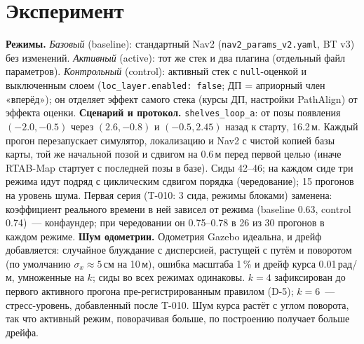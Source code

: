 \documentclass[10pt,twocolumn]{article}
\begin{document}
\section{Эксперимент}
\textbf{Режимы.} \emph{Базовый} (baseline): стандартный Nav2 (\texttt{nav2\_params\_v2.yaml}, BT v3) без изменений. \emph{Активный} (active): тот же стек и два плагина (отдельный файл параметров). \emph{Контрольный} (control): активный стек с \texttt{null}-оценкой и выключенным слоем (\texttt{loc\_layer.enabled: false}; ДП = априорный член «вперёд»); он отделяет эффект самого стека (курсы ДП, настройки PathAlign) от эффекта оценки.
\textbf{Сценарий и протокол.} \texttt{shelves\_loop\_a}: от позы появления $(-2.0,-0.5)$ через $(2.6,-0.8)$ и $(-0.5,2.45)$ назад к старту, 16.2\,м.
Каждый прогон перезапускает симулятор, локализацию и Nav2 с чистой копией базы карты, той же начальной позой и сдвигом на 0.6\,м перед первой целью (иначе RTAB-Map стартует с последней позы в базе). Сиды 42--46; на каждом сиде три режима идут подряд с циклическим сдвигом порядка (чередование); 15 прогонов на уровень шума.
Первая серия (T-010: 3 сида, режимы блоками) заменена: коэффициент реального времени в ней зависел от режима (baseline 0.63, control 0.74)~--- конфаундер; при чередовании он 0.75--0.78 в 26 из 30 прогонов в каждом режиме.
\textbf{Шум одометрии.} Одометрия Gazebo идеальна, и дрейф добавляется: случайное блуждание с дисперсией, растущей с путём и поворотом (по умолчанию $\sigma_x\approx5$\,см на 10\,м), ошибка масштаба 1\,\% и дрейф курса 0.01\,рад/м, умноженные на $k$; сиды во всех режимах одинаковы. $k=4$ зафиксирован до первого активного прогона пре-регистрированным правилом (D-5); $k=6$~--- стресс-уровень, добавленный после T-010. Шум курса растёт с углом поворота, так что активный режим, поворачивая больше, по построению получает больше дрейфа.
\end{document}
